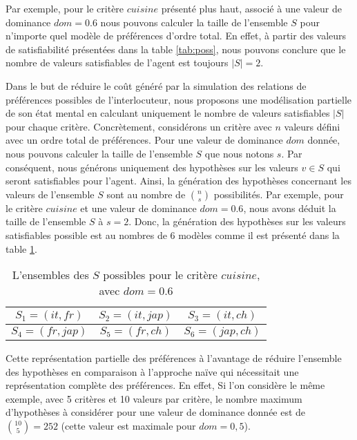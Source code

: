 		Par exemple, pour le critère $cuisine$ présenté plus haut, associé à une valeur de dominance $dom= 0.6$
		nous pouvons calculer la taille de l'ensemble $S$ pour n'importe quel modèle de préférences d'ordre total. En effet, à partir des valeurs de satisfiabilité présentées dans la table \ref{tab:poss},  nous pouvons conclure que le nombre de valeurs satisfiables de l'agent est toujours $|S| = 2$.
		
		Dans le but de réduire le coût généré par la simulation des relations de préférences possibles de l'interlocuteur, nous proposons une modélisation partielle de son état mental en calculant uniquement le nombre de valeurs satisfiables $|S|$ pour chaque critère. Concrètement, considérons un critère avec $n$ valeurs défini avec un ordre total de préférences. Pour une valeur de dominance $dom$ donnée, nous pouvons calculer la taille de l'ensemble $S$ que nous notons $s$. 
		Par conséquent, nous générons uniquement des hypothèses sur les valeurs $v \in S$ qui seront satisfiables pour l'agent. Ainsi,
		la génération des hypothèses concernant les valeurs de l'ensemble $S$ sont au nombre de  $\binom{n}{s}$ possibilités. 
		Par exemple, pour le critère $cuisine$ et une valeur de dominance $dom =0.6$, nous avons déduit la taille de l'ensemble $S$ à $s=2$. Donc, la génération des hypothèses sur les valeurs satisfiables possible est au nombres de 6 modèles comme il est présenté dans la table \ref{tab:sat_poss}.
		\begin{table}[h]
			\centering
			\caption{L'ensembles des $S$ possibles pour le critère $cuisine$, avec $dom=0.6$}
			\label{tab:sat_poss}
			\large
			\begin{tabular}{|c|c|c|}%
				\hline
				$S_1=(it,fr)$& $S_2=(it,jap)$ & $S_3=(it,ch)$\\
				\hline
				$S_4=(fr,jap)$ & $S_5=(fr,ch)$ & $S_6=(jap,ch)$ \\
				\hline
			\end{tabular}
		\end{table}
		
		Cette représentation partielle des préférences à l'avantage de réduire l'ensemble des hypothèses en comparaison à l'approche naïve qui nécessitait une représentation complète des préférences. En effet, Si l'on considère le même exemple, avec 5 critères et 10 valeurs par critère, le nombre maximum d'hypothèses à considérer pour une valeur de dominance donnée est de $ \binom {10} {5} = 252 $ (cette valeur est maximale pour $ dom = 0,5 $).
		
